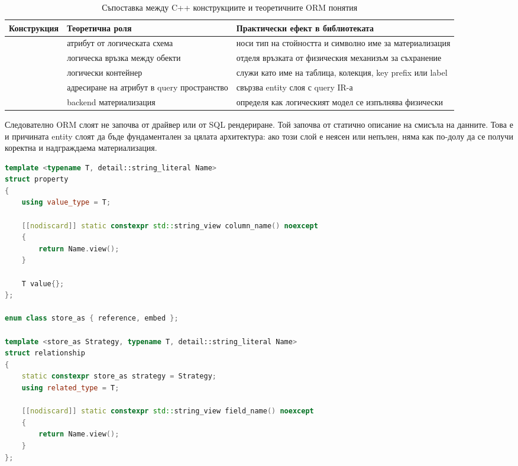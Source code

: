 \begin{table}[H]
\centering
\small
\caption{Съпоставка между C++ конструкциите и теоретичните ORM понятия}
\label{tab:cpp_to_orm_concepts}
\begin{tabularx}{\textwidth}{L{3.3cm}L{4.0cm}Y}
\toprule
\textbf{Конструкция} & \textbf{Теоретична роля} & \textbf{Практически ефект в библиотеката} \\
\midrule
{} & атрибут от логическата схема & носи тип на стойността и символно име за материализация \\
 & логическа връзка между обекти & отделя връзката от физическия механизъм за съхранение \\
 & логически контейнер & служи като име на таблица, колекция, key prefix или label \\
 & адресиране на атрибут в query пространство & свързва entity слоя с query IR-а \\
 & backend материализация & определя как логическият модел се изпълнява физически \\
\bottomrule
\end{tabularx}
\end{table}

Следователно ORM слоят не започва от драйвер или от SQL рендериране. Той започва от статично описание на смисъла на данните. Това е и причината entity слоят да бъде фундаментален за цялата архитектура: ако този слой е неясен или непълен, няма как по-долу да се получи коректна и надграждаема материализация.

\begin{lstlisting}[language=C++,caption={Извадка от \code{property} и \code{relationship} в entity слоя},label={lst:property_relationship}]
template <typename T, detail::string_literal Name>
struct property
{
    using value_type = T;

    [[nodiscard]] static constexpr std::string_view column_name() noexcept
    {
        return Name.view();
    }

    T value{};
};

enum class store_as { reference, embed };

template <store_as Strategy, typename T, detail::string_literal Name>
struct relationship
{
    static constexpr store_as strategy = Strategy;
    using related_type = T;

    [[nodiscard]] static constexpr std::string_view field_name() noexcept
    {
        return Name.view();
    }
};
\end{lstlisting}

